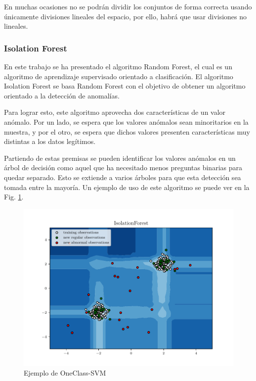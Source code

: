 En muchas ocasiones no se podrán dividir los conjuntos de forma correcta usando únicamente divisiones lineales del espacio, por ello, habrá que usar divisiones no lineales.

\subsubsection{Isolation Forest}

En este trabajo se ha presentado el algoritmo Random Forest, el cual es un algoritmo de aprendizaje supervisado orientado a clasificación. El algoritmo Isolation Forest \cite{liu2008isolation} \cite{cheng2019outlier} se basa Random Forest con el objetivo de obtener un algoritmo orientado a la detección de anomalías.

Para lograr esto, este algoritmo aprovecha dos características de un valor anómalo. Por un lado, se espera que los valores anómalos sean minoritarios en la muestra, y por el otro, se espera que dichos valores presenten características muy distintas a los datos legítimos.

Partiendo de estas premisas se pueden identificar los valores anómalos en un árbol de decisión como aquel que ha necesitado menos preguntas binarias para quedar separado. Esto se extiende a varios árboles para que esta detección sea tomada entre la mayoría. Un ejemplo de uso de este algoritmo se puede ver en la Fig. \ref{fig:ex_scikit_isolation}.

\begin{figure}[htpb!]
    \centering
    \includegraphics[scale=0.7]{images/isolation_example.pdf}
    \caption{Ejemplo de OneClass-SVM \cite{ex_scikit_isolation}}
    \label{fig:ex_scikit_isolation}
\end{figure}

